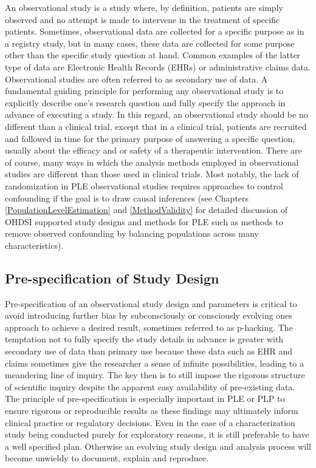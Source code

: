 \documentclass[11pt]{book}
\theoremstyle{definition}
\theoremstyle{definition}
\theoremstyle{definition}
\theoremstyle{remark}
\begin{document}
An observational study is a study where, by definition, patients are simply observed and no attempt is made to intervene in the treatment of specific patients. Sometimes, observational data are collected for a specific purpose as in a registry study, but in many cases, these data are collected for some purpose other than the specific study question at hand. Common examples of the latter type of data are Electronic Health Records (EHRs) or administrative claims data. Observational studies are often referred to as secondary use of data. A fundamental guiding principle for performing any observational study is to explicitly describe one's research question and fully specify the approach in advance of executing a study. In this regard, an observational study should be no different than a clinical trial, except that in a clinical trial, patients are recruited and followed in time for the primary purpose of answering a specific question, usually about the efficacy and or safety of a therapeutic intervention. There are of course, many ways in which the analysis methods employed in observational studies are different than those used in clinical trials. Most notably, the lack of randomization in PLE observational studies requires approaches to control confounding if the goal is to draw causal inferences (see Chapters \ref{PopulationLevelEstimation} and \ref{MethodValidity} for detailed discussion of OHDSI supported study designs and methods for PLE such as methods to remove observed confounding by balancing populations across many characteristics).

\hypertarget{pre-specification-of-study-design}{%
\subsection{Pre-specification of Study Design}\label{pre-specification-of-study-design}}

Pre-specification of an observational study design and parameters is critical to avoid introducing further bias by subconsciously or consciously evolving ones approach to achieve a desired result, sometimes referred to as p-hacking. The temptation not to fully specify the study details in advance is greater with secondary use of data than primary use because these data such as EHR and claims sometimes give the researcher a sense of infinite possibilities, leading to a meandering line of inquiry. The key then is to still impose the rigorous structure of scientific inquiry despite the apparent easy availability of pre-existing data. The principle of pre-specification is especially important in PLE or PLP to ensure rigorous or reproducible results as these findings may ultimately inform clinical practice or regulatory decisions. Even in the case of a characterization study being conducted purely for exploratory reasons, it is still preferable to have a well specified plan. Otherwise an evolving study design and analysis process will become unwieldy to document, explain and reproduce.
\end{document}
